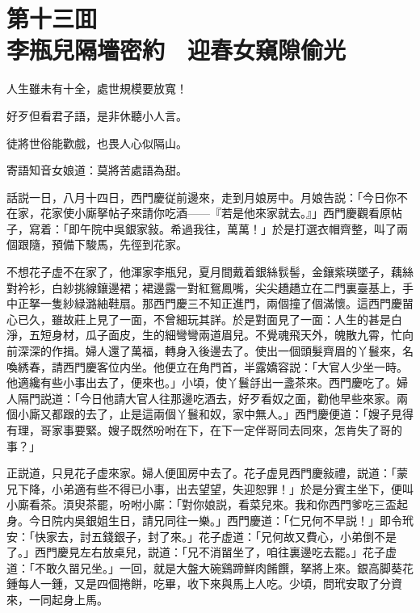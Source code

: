
\chapter*{第十三囬　\\李瓶兒隔墻密約　迎春女窺隙偷光}


\begin{myquote}
人生雖未有十全，處世規模要放寬！

好歹但看君子語，是非休聽小人言。

徒將世俗能歡戲，也畏人心似隔山。

寄語知音女娘道：莫將苦處語為甜。
\end{myquote}

話説一日，八月十四日，西門慶従前邊來，走到月娘房中。月娘告説：「今日你不在家，花家使小廝拏帖子來請你吃酒——『若是他來家就去。』」西門慶觀看原帖子，寫着：「即午院中吳銀家敍。希過我往，萬萬！」於是打選衣帽齊整，叫了兩個跟隨，預備下駿馬，先徑到花家。

不想花子虚不在家了，他渾家李瓶兒，夏月間戴着銀絲䯼髻，金鑲紫瑛墜子，藕絲對衿衫，白紗挑線鑲邊裙；裙邊露一對紅鴛鳳嘴，尖尖趫趫立在二門裏臺基上，手中正拏一隻紗緑潞紬鞋扇。那西門慶三不知正進門，兩個撞了個滿懷。這西門慶㽞心已久，雖故莊上見了一面，不曾細玩其詳。於是對面見了一面：人生的甚是白淨，五短身材，瓜子面皮，生的細彎彎兩道眉兒。不覺魂飛天外，魄散九霄，忙向前深深的作揖。婦人還了萬福，轉身入後邊去了。使出一個頭髮齊眉的丫鬟來，名喚綉春，請西門慶客位内坐。他便立在角門首，半露嬌容説：「大官人少坐一時。他適纔有些小事出去了，便來也。」小頃，使丫鬟㧱出一盞茶來。西門慶吃了。婦人隔門説道：「今日他請大官人往那邊吃酒去，好歹看奴之面，勸他早些來家。兩個小廝又都跟的去了，止是這兩個丫鬟和奴，家中無人。」西門慶便道：「嫂子見得有理，哥家事要緊。嫂子既然吩咐在下，在下一定伴哥同去同來，怎肯失了哥的事？」

正説道，只見花子虚來家。婦人便囬房中去了。花子虚見西門慶敍禮，説道：「蒙兄下降，小弟適有些不得已小事，出去望望，失迎恕罪！」於是分賓主坐下，便叫小廝看茶。湏臾茶罷，吩咐小廝：「對你娘説，看菜兒來。我和你西門爹吃三盃起身。今日院内吳銀姐生日，請兄同往一樂。」西門慶道：「仁兄何不早説！」即令玳安：「快家去，討五錢銀子，封了來。」花子虚道：「兄何故又費心，小弟倒不是了。」西門慶見左右放桌兒，説道：「兄不消㽞坐了，咱往裏邊吃去罷。」花子虚道：「不敢久㽞兄坐。」一回，就是大盤大碗鷄蹄鮮肉餚饌，拏將上來。銀高脚葵花鍾每人一鍾，又是四個捲餅，吃畢，收下來與馬上人吃。少頃，問玳安取了分資來，一同起身上馬。

